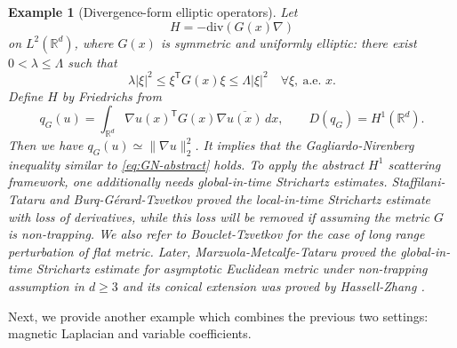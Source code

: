 \documentclass[10pt%
]{amsart}
\numberwithin{equation}{section}
\newtheorem{example}{Example}[section]
\theoremstyle{definition}
\begin{document}
	
\begin{example}[Divergence-form elliptic operators]
Let
		\[
		H=-\mathrm{div}(G(x)\nabla)
		\]
		on $L^2(\mathbb R^d)$, where $G(x)$ is symmetric and uniformly elliptic:
		there exist $0<\lambda\le\Lambda$ such that
		\[
		\lambda|\xi|^2\le \xi^{\mathsf T}G(x)\xi\le \Lambda|\xi|^2\quad\forall \xi,\ \text{a.e. }x.
		\]
		Define $H$ by Friedrichs from
		\[
		q_G(u)=\int_{\mathbb R^d}\nabla u(x)^{\mathsf T}G(x)\nabla\overline{u(x)}\,dx,\qquad D(q_G)=H^1(\mathbb R^d).
		\]
		Then we have $q_G(u)\simeq \|\nabla u\|_2^2$. It implies that the  Gagliardo-Nirenberg inequality similar to \eqref{eq:GN-abstract} holds. To apply the abstract $H^1$ scattering framework, one additionally needs global-in-time Strichartz estimates.
 Staffilani-Tataru \cite{Staffilani-Tataru} and Burq-G\'erard-Tzvetkov \cite{BGT} proved the local-in-time Strichartz estimate with loss of derivatives, while this loss will be removed if assuming the metric $G$ is non-trapping. We also refer to Bouclet-Tzvetkov \cite{Bouclet} for the case of long range perturbation of flat metric. Later, Marzuola-Metcalfe-Tataru \cite{MMT-JFA} proved the global-in-time Strichartz estimate for asymptotic Euclidean metric under non-trapping assumption in $d\geq3$ and its conical extension was proved by Hassell-Zhang \cite{Hassell-Zhang}.
	\end{example}
	Next, we provide another example which combines the previous two settings: magnetic Laplacian and variable coefficients.
\end{document}
